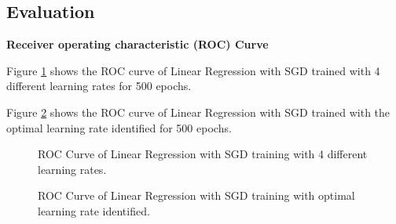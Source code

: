 \documentclass{article} %
\begin{document}
\subsection{Evaluation}

\textbf{Receiver operating characteristic (ROC) Curve}

Figure \ref{Fig2} shows the ROC curve of Linear Regression with SGD trained with 4 different learning rates for 500 epochs.

Figure \ref{Fig3} shows the ROC curve of Linear Regression with SGD trained with the optimal learning rate identified for 500 epochs.

\begin{figure}[!htbp]
\begin{center}
\end{center}
\caption{ROC Curve of Linear Regression with SGD training with 4 different learning rates.}
\label{Fig2}
\end{figure}

\begin{figure}[!htbp]
\begin{center}
\end{center}
\caption{ROC Curve of Linear Regression with SGD training with optimal learning rate identified.}
\label{Fig3}
\end{figure}
\end{document}
